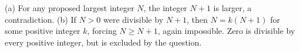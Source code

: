 (a) For any proposed largest integer $N$, the integer $N+1$ is larger, a contradiction. (b) If $N>0$ were divisible by $N+1$, then $N=k(N+1)$ for some positive integer $k$, forcing $N\ge N+1$, again impossible. Zero is divisible by every positive integer, but is excluded by the question.
